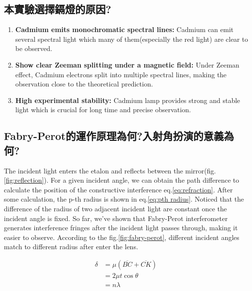 \documentclass[a4paper,12pt]{article}
\begin{document}
    \subsection{本實驗選擇鎘燈的原因?}
    \begin{enumerate}
        \item \textbf{Cadmium emits monochromatic spectral lines: }
        Cadmium can emit several spectral light which many of them(especially the red light) are clear to  be observed. 
    
        \item \textbf{Show clear Zeeman splitting under a magnetic field: }
        Under Zeeman effect, Cadmium electrons split into multiple spectral lines, making the observation close to the theoretical prediction.
    
        \item \textbf{High experimental stability: }
        Cadmium lamp provides strong and stable light which is crucial for long time and precise observation.
    
    \end{enumerate}
    
    \subsection{Fabry-Perot的運作原理為何?入射角扮演的意義為何?}
    \par The incident light enters the etalon and reflects between the mirror(fig.\ref{fig:reflection}). For a given incident angle, we can obtain the path difference to calculate the position of the constructive interference eq.\ref{eq:refraction}. After some calculation, the p-th radius is shown in eq.\ref{eq:pth radius}. Noticed that the difference of the radius of two adjacent incident light are constant once the incident angle is fixed. So far, we've shown that Fabry-Perot interferometer generates interference fringes after the incident light passes through, making it easier to observe. According to the fig.\ref{fig:fabry-perot}, different incident angles match to different radius after enter the lens.
    
    
    \begin{align}
        \delta &= \mu (\overline{BC} + \overline{CK}) \\
               &= 2\mu t \cos{\theta} \\
               &= n\lambda
        \label{eq:refraction}
    \end{align}
    
\end{document}
